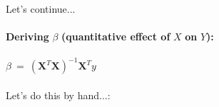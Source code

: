 \documentclass[10pt]{article}
\begin{document}
\paragraph{}Let's continue...





\paragraph{}{\Large \textbf{Deriving} \;$\displaystyle \beta $\textbf{ (quantitative effect of} $\displaystyle X$ \textbf{on} $\displaystyle Y$\textbf{):}}
\\
\\
$\displaystyle \beta \ =\ \left( \boldsymbol{X}^{T} \boldsymbol{X}\right)^{-1} \boldsymbol{X}^{T} y$



\paragraph{}Let's do this by hand...:
\end{document}
